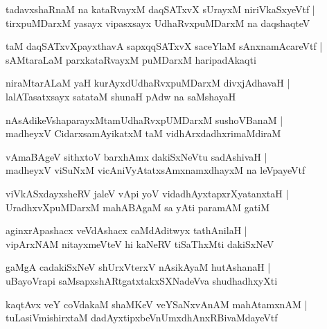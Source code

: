 \documentclass[twoside,12pt,openright]{book}
\newcounter{shloka}[chapter]
\begin{document}
\begin{shloka}%
tadavxshaRnaM na kataRvayxM daqSATxvX sUrayxM niriVkaSxyeVtf |\\
tirxpuMDarxM yasayx vipasxsayx UdhaRvxpuMDarxM na daqshaqteV 
\end{shloka}

\begin{shloka}%
taM daqSATxvXpayxthavA sapxqqSATxvX saceYlaM sAnxnamAcareVtf |\\
sAMtaraLaM parxkataRvayxM puMDarxM haripadAkaqti
\end{shloka}

\begin{shloka}%
niraMtarALaM yaH kurAyxdUdhaRvxpuMDarxM divxjAdhavaH |\\
lalATasatxsayx satataM shunaH pAdw na saMshayaH 
\end{shloka}

\begin{shloka}%
nAsAdikeVshaparayxMtamUdhaRvxpUMDarxM sushoVBanaM |\\
madheyxV CidarxsamAyikatxM taM vidhArxdadhxrimaMdiraM 
\end{shloka}

\begin{shloka}%
vAmaBAgeV sithxtoV barxhAmx dakiSxNeVtu sadAshivaH |\\
madheyxV viSuNxM  vicAniVyAtatxsAmxnamxdhayxM na leVpayeVtf 
\end{shloka}

\begin{shloka}%
viVkASxdayxsheRV jaleV vApi yoV vidadhAyxtapxrXyatanxtaH |\\
UradhxvXpuMDarxM mahABAgaM sa yAti paramAM gatiM 
\end{shloka}

\begin{shloka}%
aginxrApashacx veVdAshacx caMdAditwyx tathAnilaH |\\
vipArxNAM nitayxmeVteV hi kaNeRV tiSaThxMti dakiSxNeV
\end{shloka}

\begin{shloka}%
gaMgA cadakiSxNeV shUrxVterxV nAsikAyaM hutAshanaH |\\
uBayoVrapi saMsapxshARtgatxtakxSXNadeVva shudhadhxyXti
\end{shloka}

\begin{shloka}%
kaqtAvx veY coVdakaM shaMKeV veYSaNxvAnAM mahAtamxnAM |\\
tuLasiVmishirxtaM dadAyxtipxbeVnUmxdhAnxRBivaMdayeVtf 
\end{shloka}
\end{document}
